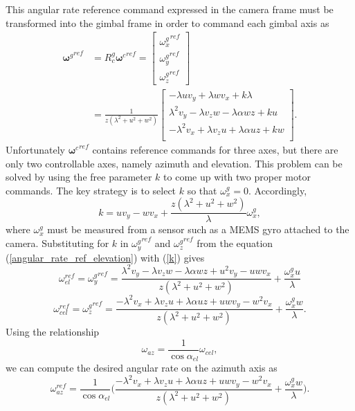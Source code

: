 This angular rate reference command expressed in the camera frame must be transformed into the gimbal frame in order to command each gimbal axis as
\begin{align}
{\mathbf{\omega}^g}^{ref}&=R_c^g{\mathbf{\omega}^c}^{ref}
=\begin{bmatrix}
{\omega_x^g}^{ref} \\ {\omega_y^g}^{ref} \\ {\omega_z^g}^{ref}
\end{bmatrix}
\\&=\frac{1}{z(\lambda^2+u^2+w^2)}\begin{bmatrix}
-\lambda u v_y+\lambda w v_x +k\lambda \\
\lambda^2 v_y-\lambda v_z w -\lambda \alpha wz+ku \\
-\lambda^2 v_x+\lambda v_zu +\lambda \alpha uz+kw \\
\end{bmatrix}.
\label{angular_rate_ref_elevation}
\end{align}
Unfortunately ${\mathbf{\omega}^c}^{ref}$ contains reference commands for three axes, but there are only two controllable axes, namely azimuth and elevation. This problem can be solved by using the free parameter $k$ to come up with two proper motor commands. The key strategy is to select $k$ so that $\omega_x^g=0$. Accordingly,  
\begin{equation}
k=uv_y-wv_x+\frac{z(\lambda^2+u^2+w^2)}{\lambda}\omega_x^g,
\label{k}
\end{equation}
where $\omega_x^g$ must be measured from a sensor such as a MEMS gyro attached to the camera. Substituting for $k$ in ${\omega_y^g}^{ref}$ and ${\omega_z^g}^{ref}$ from the equation (\ref{angular_rate_ref_elevation}) with (\ref{k}) gives
\begin{equation}
\omega_{el}^{ref}={\omega_y^g}^{ref}=\frac{\lambda^2 v_y-\lambda v_z w -\lambda \alpha wz+u^2 v_y-uwv_x}{z(\lambda^2+u^2+w^2)}+\frac{\omega_x^g u}{\lambda}
\end{equation}
\begin{equation}
\omega_{cel}^{ref}={\omega_z^g}^{ref}=\frac{-\lambda^2 v_x+\lambda v_z u+\lambda \alpha uz +uwv_y -w^2 v_x}{z(\lambda^2+u^2+w^2)}+\frac{\omega_x^g w}{\lambda}.
\end{equation}
Using the relationship 
\begin{equation}
\omega_{az}=\frac{1}{\cos\alpha_{el}}\omega_{cel},
\end{equation}
we can compute the desired angular rate on the azimuth axis as
\begin{equation}
\omega_{az}^{ref}=\frac{1}{\cos \alpha_{el}}\bigg(\frac{-\lambda^2 v_x+\lambda v_z u+\lambda \alpha uz +uwv_y -w^2 v_x}{z(\lambda^2+u^2+w^2)}+\frac{\omega_x^g w}{\lambda}\bigg).
\end{equation}
